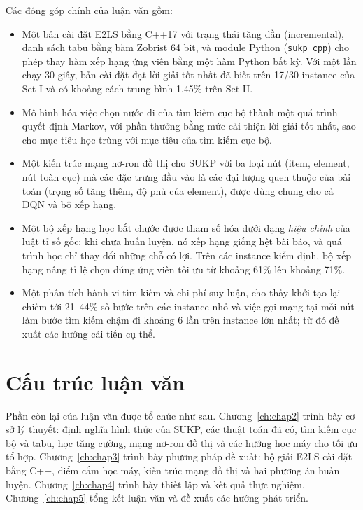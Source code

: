 Các đóng góp chính của luận văn gồm:
\begin{itemize}
  \item Một bản cài đặt E2LS bằng C++17 với trạng thái tăng dần (incremental), danh sách tabu bằng băm Zobrist 64 bit, và module Python (\texttt{sukp\_cpp}) cho phép thay hàm xếp hạng ứng viên bằng một hàm Python bất kỳ. Với một lần chạy 30 giây, bản cài đặt đạt lời giải tốt nhất đã biết trên 17/30 instance của Set I và có khoảng cách trung bình 1.45\% trên Set II.
  \item Mô hình hóa việc chọn nước đi của tìm kiếm cục bộ thành một quá trình quyết định Markov, với phần thưởng bằng mức cải thiện lời giải tốt nhất, sao cho mục tiêu học trùng với mục tiêu của tìm kiếm cục bộ.
  \item Một kiến trúc mạng nơ-ron đồ thị cho SUKP với ba loại nút (item, element, nút toàn cục) mà các đặc trưng đầu vào là các đại lượng quen thuộc của bài toán (trọng số tăng thêm, độ phủ của element), được dùng chung cho cả DQN và bộ xếp hạng.
  \item Một bộ xếp hạng học bắt chước được tham số hóa dưới dạng \emph{hiệu chỉnh} của luật tỉ số gốc: khi chưa huấn luyện, nó xếp hạng giống hệt bài báo, và quá trình học chỉ thay đổi những chỗ có lợi. Trên các instance kiểm định, bộ xếp hạng nâng tỉ lệ chọn đúng ứng viên tối ưu từ khoảng 61\% lên khoảng 71\%.
  \item Một phân tích hành vi tìm kiếm và chi phí suy luận, cho thấy khởi tạo lại chiếm tới 21--44\% số bước trên các instance nhỏ và việc gọi mạng tại mỗi nút \addstar làm bước tìm kiếm chậm đi khoảng 6 lần trên instance lớn nhất; từ đó đề xuất các hướng cải tiến cụ thể.
\end{itemize}

\section{Cấu trúc luận văn}

Phần còn lại của luận văn được tổ chức như sau. Chương~\ref{ch:chap2} trình bày cơ sở lý thuyết: định nghĩa hình thức của SUKP, các thuật toán đã có, tìm kiếm cục bộ và tabu, học tăng cường, mạng nơ-ron đồ thị và các hướng học máy cho tối ưu tổ hợp. Chương~\ref{ch:chap3} trình bày phương pháp đề xuất: bộ giải E2LS cài đặt bằng C++, điểm cắm học máy, kiến trúc mạng đồ thị và hai phương án huấn luyện. Chương~\ref{ch:chap4} trình bày thiết lập và kết quả thực nghiệm. Chương~\ref{ch:chap5} tổng kết luận văn và đề xuất các hướng phát triển.
